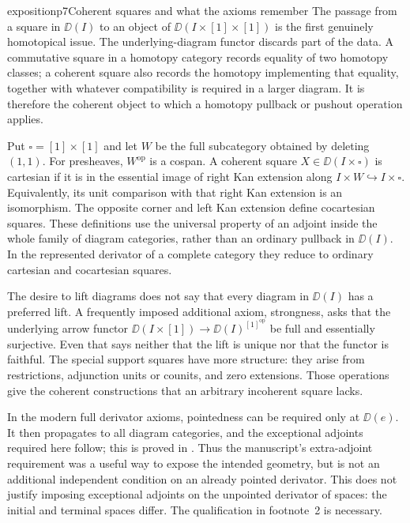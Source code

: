 \begin{dcomment}{exposition}{p7}{Coherent squares and what the axioms remember}
The passage from a square in $\DD(I)$ to an object of $\DD(I\times[1]\times[1])$ is the first genuinely homotopical issue. The underlying-diagram functor discards part of the data. A commutative square in a homotopy category records equality of two homotopy classes; a coherent square also records the homotopy implementing that equality, together with whatever compatibility is required in a larger diagram. It is therefore the coherent object to which a homotopy pullback or pushout operation applies.

Put $\square=[1]\times[1]$ and let $W$ be the full subcategory obtained by deleting $(1,1)$. For presheaves, $W^{\mathrm{op}}$ is a cospan. A coherent square $X\in\DD(I\times\square)$ is cartesian if it is in the essential image of right Kan extension along $I\times W\hookrightarrow I\times\square$. Equivalently, its unit comparison with that right Kan extension is an isomorphism. The opposite corner and left Kan extension define cocartesian squares. These definitions use the universal property of an adjoint inside the whole family of diagram categories, rather than an ordinary pullback in $\DD(I)$. In the represented derivator of a complete category they reduce to ordinary cartesian and cocartesian squares.

The desire to lift diagrams does not say that every diagram in $\DD(I)$ has a preferred lift. A frequently imposed additional axiom, strongness, asks that the underlying arrow functor $\DD(I\times[1])\to\DD(I)^{[1]^{\mathrm{op}}}$ be full and essentially surjective. Even that says neither that the lift is unique nor that the functor is faithful. The special support squares have more structure: they arise from restrictions, adjunction units or counits, and zero extensions. Those operations give the coherent constructions that an arbitrary incoherent square lacks.

In the modern full derivator axioms, pointedness can be required only at $\DD(e)$. It then propagates to all diagram categories, and the exceptional adjoints required here follow; this is proved in \citet[Proposition~3.2 and Corollary~3.8]{Groth2013}. Thus the manuscript's extra-adjoint requirement was a useful way to expose the intended geometry, but is not an additional independent condition on an already pointed derivator. This does not justify imposing exceptional adjoints on the unpointed derivator of spaces: the initial and terminal spaces differ. The qualification in footnote~2 is necessary.
\end{dcomment}


